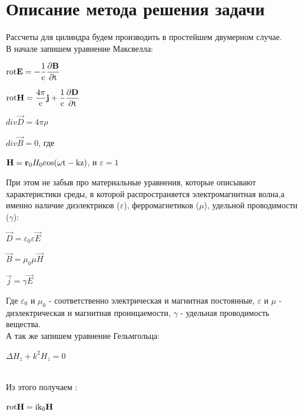 \section{Описание метода решения задачи}
Рассчеты для цилиндра будем производить в простейшем двумерном случае.
\\
В начале запишем уравнение Максвелла: \\
\begin{center}
	$ 	\rm rot\vec{E} = -\dfrac{1}{c}\dfrac{\partial \vec{B}}{\partial t} $ 
\end{center}
\begin{center}
	$ 	\rm rot\vec{H} =\dfrac{4\pi}{c}\vec{j} + \dfrac{1}{c}\dfrac{\partial \vec{D}}{\partial t} $
\end{center}
\begin{center}
	$ 	div\vec{D} = 4\pi \rho $
\end{center}
	\begin{center}
		$ div \vec{B} = 0 $, где
	\end{center} 
\begin{center}
	$ \vec{H} = \vec{r}_{0}H_{0}\rm cos(\omega t - kz) $, и $ \varepsilon = 1 $ \\
\end{center}
При этом не забыв про материальные уравнения, которые описывают характеристики среды, в которой распространяется электромагнитная волна,а именно наличие диэлектриков ($ \varepsilon $), ферромагнетиков ($ \mu $), удельной проводимости ($ \gamma $):
\begin{center}
	$ \vec{D} = \varepsilon_{0} \varepsilon \vec{E} $
\end{center}
\begin{center}
	$ \vec{B} = \mu_{0} \mu \vec{H} $
\end{center}
\begin{center}
	$ \vec{j} = \gamma \vec{E} $
\end{center}
Где $ \varepsilon_{0} $ и $ \mu_{0} $ - соответственно электрическая и магнитная постоянные, $ \varepsilon $ и $ \mu $ - диэлектрическая и магнитная проницаемости, $ \gamma $ - удельная проводимость вещества. \\
А так же запишем уравнение Гельмгольца:
\begin{center}
	$ \Delta H_{z} + k^2H_{z} = 0 $ 
\end{center}\\
Из этого получаем : \begin{center}
	$ \rm rot\vec{H} = ik_{0}\vec{H} $
\end{center}
